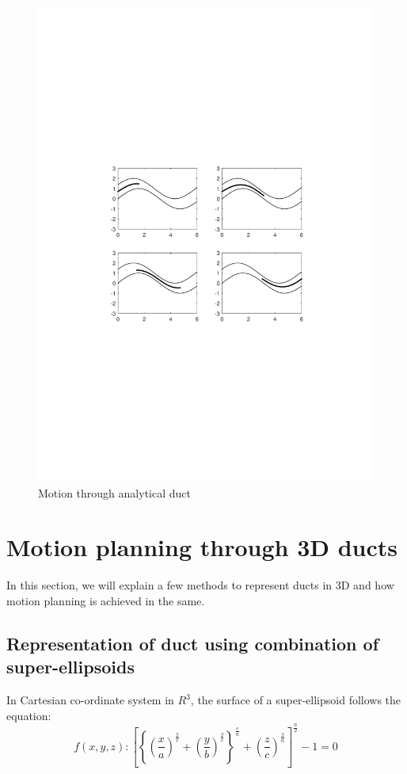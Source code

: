 \documentclass[11pt,a4paper]{article}
\begin{document}
\begin{figure}[h]
\centering
\includegraphics[scale=0.75]{figures/fig12.pdf}
\caption{ Motion through analytical duct \label{fig:analyticductmotion}}
\end{figure}


\section{Motion planning through 3D ducts}
In this section, we will explain a few methods to represent ducts in 3D and how motion planning is achieved in the same.
\subsection{Representation of duct using combination of super-ellipsoids}
In Cartesian co-ordinate system in $R^3$, the surface of a super-ellipsoid follows the equation:
\begin{equation}
f(x,y,z) : \left[ \left\lbrace \left(\frac{x}{a} \right)^{\frac 2e} +\left(\frac{y}{b} \right)^{\frac 2e} \right\rbrace^{\frac{e}{n}} +\left(\frac{z}{c} \right)^{\frac 2n}  \right]^\frac n2-1 =0
\end{equation}
\end{document}
